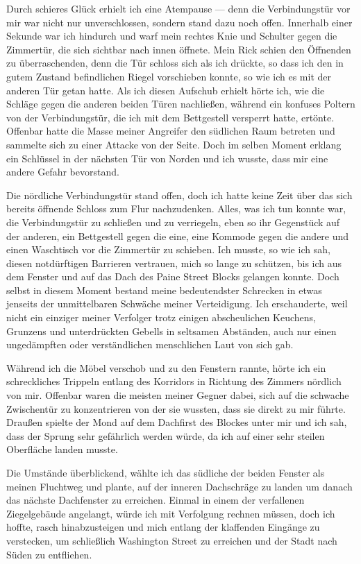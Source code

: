 Durch schieres Glück erhielt ich eine Atempause --- denn die Verbindungstür vor mir war nicht nur unverschlossen, sondern stand dazu noch offen. Innerhalb einer Sekunde war ich hindurch und warf mein rechtes Knie und Schulter gegen die Zimmertür, die sich sichtbar nach innen öffnete. Mein Rick schien den Öffnenden zu überraschenden, denn die Tür schloss sich als ich drückte, so dass ich den in gutem Zustand befindlichen Riegel vorschieben konnte, so wie ich es mit der anderen Tür getan hatte. Als ich diesen Aufschub erhielt hörte ich, wie die Schläge gegen die anderen beiden Türen nachließen, während ein konfuses Poltern von der Verbindungstür, die ich mit dem Bettgestell versperrt hatte, ertönte. Offenbar hatte die Masse meiner Angreifer den südlichen Raum betreten und sammelte sich zu einer Attacke von der Seite. Doch im selben Moment erklang ein Schlüssel in der nächsten Tür von Norden und ich wusste, dass mir eine andere Gefahr bevorstand.

Die nördliche Verbindungstür stand offen, doch ich hatte keine Zeit über das sich bereits öffnende Schloss zum Flur nachzudenken. Alles, was ich tun konnte war, die Verbindungstür zu schließen und zu verriegeln, eben so ihr Gegenstück auf der anderen, ein Bettgestell gegen die eine, eine Kommode gegen die andere und einen  Waschtisch vor die Zimmertür zu schieben. Ich musste, so wie ich sah, diesen notdürftigen Barrieren vertrauen, mich so lange zu schützen, bis ich aus dem Fenster und auf das Dach des Paine Street Blocks gelangen konnte. Doch selbst in diesem Moment bestand meine bedeutendster Schrecken in etwas jenseits der unmittelbaren Schwäche meiner Verteidigung. Ich erschauderte, weil nicht ein einziger meiner Verfolger trotz einigen abscheulichen Keuchens, Grunzens und unterdrückten Gebells in seltsamen Abständen, auch nur einen ungedämpften oder verständlichen menschlichen Laut von sich gab.

Während ich die Möbel verschob und zu den Fenstern rannte, hörte ich ein schreckliches Trippeln entlang des Korridors in Richtung des Zimmers nördlich von mir. Offenbar waren die meisten meiner Gegner dabei, sich auf die schwache Zwischentür zu konzentrieren von der sie wussten, dass sie direkt zu mir führte. Draußen spielte der Mond auf dem Dachfirst des Blockes unter mir und ich sah, dass der Sprung sehr gefährlich werden würde, da ich auf einer sehr steilen Oberfläche landen musste.

Die Umstände überblickend, wählte ich das südliche der beiden Fenster als meinen Fluchtweg und plante, auf der inneren Dachschräge zu landen um danach das nächste Dachfenster zu erreichen. Einmal in einem der verfallenen Ziegelgebäude angelangt, würde ich mit Verfolgung rechnen müssen, doch ich hoffte, rasch hinabzusteigen und mich entlang der klaffenden Eingänge zu verstecken, um schließlich Washington Street zu erreichen und der Stadt nach Süden zu entfliehen.

